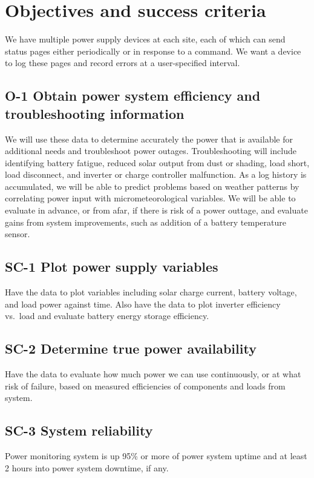 \documentclass[pdftex,oneside,12pt,a4paper]{book}
\begin{document}
\section{Objectives and success criteria}
We have multiple power supply devices at each site, each of which can send status pages either periodically or in response to a command.  We want a device to log these pages and record errors at a user-specified interval.

\subsection{O-1 Obtain power system efficiency and troubleshooting information}
We will use these data to determine accurately the power that is available for additional needs and troubleshoot power outages. Troubleshooting will include identifying battery fatigue, reduced solar output from dust or shading, load short, load disconnect, and inverter or charge controller malfunction. As a log history is accumulated, we will be able to predict problems based on weather patterns by correlating power input with micrometeorological variables.  We will be able to evaluate in advance, or from afar, if there is risk of a power outtage, and evaluate gains from system improvements, such as addition of a battery temperature sensor.

\subsection{SC-1 Plot power supply variables}
Have the data to plot variables including solar charge current, battery voltage, and load power against time.  Also have the data to plot inverter efficiency vs.\ load and evaluate battery energy storage efficiency.

\subsection{SC-2 Determine true power availability}
Have the data to evaluate how much power we can use continuously, or at what risk of failure, based on measured efficiencies of components and loads from system.

\subsection{SC-3 System reliability}
Power monitoring system is up 95\% or more of power system uptime and at least 2 hours into power system downtime, if any.
\end{document}
